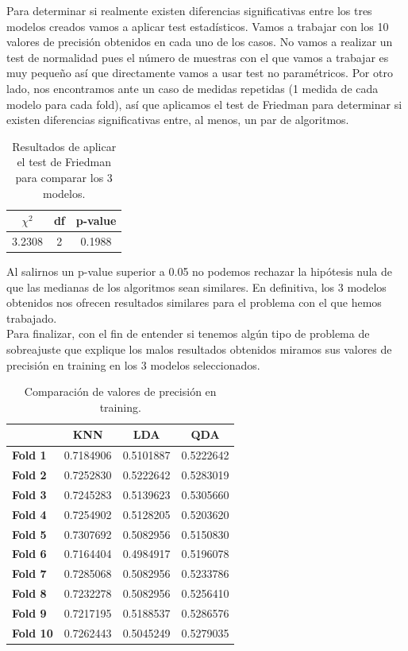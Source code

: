 \documentclass[a4paper,12pt, oneside]{book}
\begin{document}
Para determinar si realmente existen diferencias significativas entre los tres modelos creados vamos a aplicar test estadísticos. Vamos a trabajar con los 10 valores de precisión obtenidos en cada uno de los casos. No vamos a realizar un test de normalidad pues el número de muestras con el que vamos a trabajar es muy pequeño así que directamente vamos a usar test no paramétricos. Por otro lado, nos encontramos ante un caso de medidas repetidas (1 medida de cada modelo para cada fold), así que aplicamos el test de Friedman para determinar si existen diferencias significativas entre, al menos, un par de algoritmos. \\

\begin{table}[H]
\centering
\begin{tabular}{@{}ccc@{}}
\toprule
$\chi^2$ & df & p-value \\ \midrule
3.2308 & 2 & 0.1988 \\ \bottomrule
\end{tabular}
\caption{Resultados de aplicar el test de Friedman para comparar los 3 modelos.}
\label{tab:friedmanclass}
\end{table}

Al salirnos un p-value superior a 0.05 no podemos rechazar la hipótesis nula de que las medianas de los algoritmos sean similares. En definitiva, los 3 modelos obtenidos nos ofrecen resultados similares para el problema con el que hemos trabajado.\\

Para finalizar, con el fin de entender si tenemos algún tipo de problema de sobreajuste que explique los malos resultados obtenidos miramos sus valores de precisión en training en los 3 modelos seleccionados.\\

\begin{table}[H]
\centering
\begin{tabular}{@{}lccc@{}}
\toprule
{}&{\textbf{KNN}} & \textbf{LDA} & \textbf{QDA}\\ \midrule
\textbf{Fold 1} & 0.7184906 & 0.5101887   & 0.5222642\\
\textbf{Fold 2} & 0.7252830 & 0.5222642   & 0.5283019\\
\textbf{Fold 3} & 0.7245283 & 0.5139623   & 0.5305660\\
\textbf{Fold 4} & 0.7254902 & 0.5128205   & 0.5203620\\
\textbf{Fold 5} & 0.7307692 & 0.5082956   & 0.5150830\\
\textbf{Fold 6} & 0.7164404 & 0.4984917   & 0.5196078\\
\textbf{Fold 7} & 0.7285068 & 0.5082956   & 0.5233786\\
\textbf{Fold 8} & 0.7232278 & 0.5082956   & 0.5256410\\
\textbf{Fold 9} & 0.7217195 & 0.5188537   & 0.5286576\\
\textbf{Fold 10} & 0.7262443 & 0.5045249  &  0.5279035\\\bottomrule
\end{tabular}
\caption{Comparación de valores de precisión en training.}
\label{tab:acctraining}
\end{table}
\end{document}
